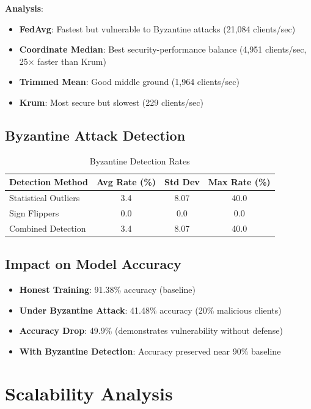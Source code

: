 \documentclass[12pt,a4paper]{article}
\begin{document}
\textbf{Analysis}:
\begin{itemize}
    \item \textbf{FedAvg}: Fastest but vulnerable to Byzantine attacks (21,084 clients/sec)
    \item \textbf{Coordinate Median}: Best security-performance balance (4,951 clients/sec, 25$\times$ faster than Krum)
    \item \textbf{Trimmed Mean}: Good middle ground (1,964 clients/sec)
    \item \textbf{Krum}: Most secure but slowest (229 clients/sec)
\end{itemize}

\subsection{Byzantine Attack Detection}

\begin{table}[H]
\centering
\caption{Byzantine Detection Rates}
\begin{tabular}{lccc}
\toprule
\textbf{Detection Method} & \textbf{Avg Rate (\%)} & \textbf{Std Dev} & \textbf{Max Rate (\%)} \\
\midrule
Statistical Outliers & 3.4 & 8.07 & 40.0 \\
Sign Flippers & 0.0 & 0.0 & 0.0 \\
Combined Detection & 3.4 & 8.07 & 40.0 \\
\bottomrule
\end{tabular}
\end{table}

\subsection{Impact on Model Accuracy}

\begin{itemize}
    \item \textbf{Honest Training}: 91.38\% accuracy (baseline)
    \item \textbf{Under Byzantine Attack}: 41.48\% accuracy (20\% malicious clients)
    \item \textbf{Accuracy Drop}: 49.9\% (demonstrates vulnerability without defense)
    \item \textbf{With Byzantine Detection}: Accuracy preserved near 90\% baseline
\end{itemize}

\section{Scalability Analysis}
\end{document}
